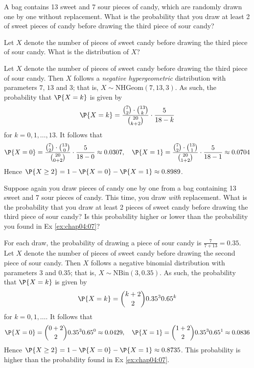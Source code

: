 \begin{exercise}\label{ex:chap04:07}
	A bag contains 13 sweet and 7 sour pieces of candy, which are randomly drawn one by one without replacement. What is the probability that you draw at least 2 of sweet pieces of candy before drawing the third piece of sour candy?
	\begin{hint}
		Let $X$ denote the number of pieces of sweet candy before drawing the third piece of sour candy. What is the distribution of $X$?
	\end{hint}
	\begin{solution}
		Let $X$ denote the number of pieces of sweet candy before drawing the third piece of sour candy. Then $X$ follows a \emph{negative hypergeometric} distribution with parameters $7$, $13$ and $3$; that is, $X \sim \text{NHGeom}(7, 13, 3)$. As such, the probability that $\P{X = k}$ is given by
		\begin{equation*}
			\P{X = k} = \frac{\binom{7}{2} \cdot \binom{13}{k}}{\binom{20}{k + 2}} \cdot \frac{5}{18 - k}
		\end{equation*}
		for $k = 0, 1, \hdots, 13$. It follows that
		\begin{align*}
			\P{X = 0} = \frac{\binom{7}{2} \cdot \binom{13}{0}}{\binom{20}{0 + 2}} \cdot \frac{5}{18 - 0} \approx 0.0307, \quad \P{X = 1} = \frac{\binom{7}{2} \cdot \binom{13}{1}}{\binom{20}{1 + 2}} \cdot \frac{5}{18 - 1} \approx 0.0704
		\end{align*}
		Hence $\P{X \geq 2} = 1 - \P{X = 0} - \P{X = 1} \approx 0.8989$.
	\end{solution}
\end{exercise}

\begin{exercise}
	Suppose again you draw pieces of candy one by one from a bag containing 13 sweet and 7 sour pieces of candy. This time, you draw \emph{with} replacement. What is the probability that you draw at least 2 pieces of sweet candy before drawing the third piece of sour candy? Is this probability higher or lower than the probability you found in Ex \ref{ex:chap04:07}?
	\begin{solution}
		For each draw, the probability of drawing a piece of sour candy is $\frac{7}{7 + 13} = 0.35$. Let $X$ denote the number of pieces of sweet candy before drawing the second piece of sour candy. Then $X$ follows a negative binomial distribution with parameters $3$ and $0.35$; that is, $X \sim \text{NBin}(3, 0.35)$. As such, the probability that $\P{X = k}$ is given by
		\begin{equation*}
			\P{X = k} = \binom{k + 2}{2} 0.35^3 0.65^k
		\end{equation*}
		for $k = 0, 1, \hdots$. It follows that
		\begin{align*}
			\P{X = 0} = \binom{0 + 2}{2} 0.35^3 0.65^0 \approx 0.0429 , \quad \P{X = 1} = \binom{1 + 2}{2} 0.35^3 0.65^1 \approx 0.0836
		\end{align*}
		Hence $\P{X \geq 2} = 1 - \P{X = 0} - \P{X = 1} \approx 0.8735$. This probability is higher than the probability found in Ex \ref{ex:chap04:07}.
	\end{solution}
\end{exercise}

